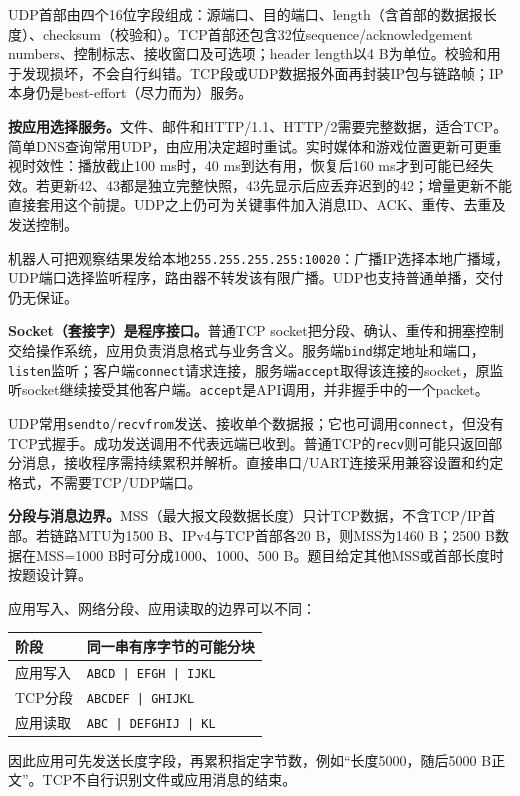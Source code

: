 UDP首部由四个16位字段组成：源端口、目的端口、length（含首部的数据报长度）、checksum（校验和）。TCP首部还包含32位sequence/acknowledgement numbers、控制标志、接收窗口及可选项；header length以4 B为单位。校验和用于发现损坏，不会自行纠错。TCP段或UDP数据报外面再封装IP包与链路帧；IP本身仍是best-effort（尽力而为）服务。

\textbf{按应用选择服务。}文件、邮件和HTTP/1.1、HTTP/2需要完整数据，适合TCP。简单DNS查询常用UDP，由应用决定超时重试。实时媒体和游戏位置更新可更重视时效性：播放截止100 ms时，40 ms到达有用，恢复后160 ms才到可能已经失效。若更新42、43都是独立完整快照，43先显示后应丢弃迟到的42；增量更新不能直接套用这个前提。UDP之上仍可为关键事件加入消息ID、ACK、重传、去重及发送控制。

机器人可把观察结果发给本地\texttt{255.255.255.255:10020}：广播IP选择本地广播域，UDP端口选择监听程序，路由器不转发该有限广播。UDP也支持普通单播，交付仍无保证。

\textbf{Socket（套接字）是程序接口。}普通TCP socket把分段、确认、重传和拥塞控制交给操作系统，应用负责消息格式与业务含义。服务端\texttt{bind}绑定地址和端口，\texttt{listen}监听；客户端\texttt{connect}请求连接，服务端\texttt{accept}取得该连接的socket，原监听socket继续接受其他客户端。\texttt{accept}是API调用，并非握手中的一个packet。

UDP常用\texttt{sendto}/\texttt{recvfrom}发送、接收单个数据报；它也可调用\texttt{connect}，但没有TCP式握手。成功发送调用不代表远端已收到。普通TCP的\texttt{recv}则可能只返回部分消息，接收程序需持续累积并解析。直接串口/UART连接采用兼容设置和约定格式，不需要TCP/UDP端口。


\textbf{分段与消息边界。}MSS（最大报文段数据长度）只计TCP数据，不含TCP/IP首部。若链路MTU为1500 B、IPv4与TCP首部各20 B，则MSS为1460 B；2500 B数据在MSS=1000 B时可分成1000、1000、500 B。题目给定其他MSS或首部长度时按题设计算。

应用写入、网络分段、应用读取的边界可以不同：
\begin{center}
\small
\begin{tabular}{@{}ll@{}}
\toprule
阶段 & 同一串有序字节的可能分块 \\
\midrule
应用写入 & \texttt{ABCD | EFGH | IJKL} \\
TCP分段 & \texttt{ABCDEF | GHIJKL} \\
应用读取 & \texttt{ABC | DEFGHIJ | KL} \\
\bottomrule
\end{tabular}
\end{center}
因此应用可先发送长度字段，再累积指定字节数，例如“长度5000，随后5000 B正文”。TCP不自行识别文件或应用消息的结束。

